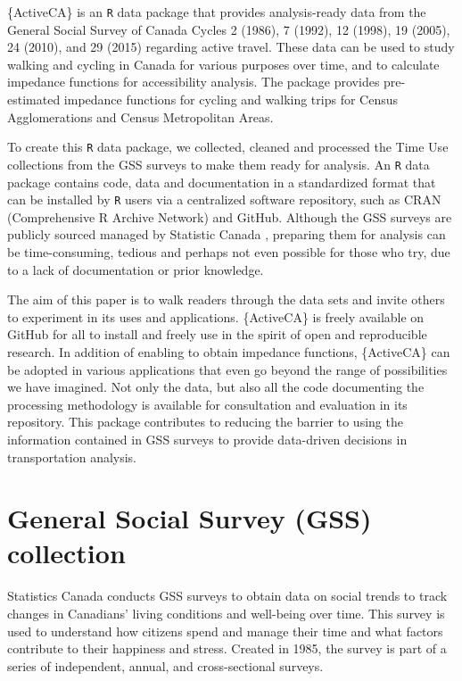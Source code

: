 \documentclass[Royal,times,sageh]{sagej}
\begin{document}
\{ActiveCA\} is an \texttt{R} data package that provides analysis-ready
data from the General Social Survey of Canada Cycles 2 (1986), 7 (1992),
12 (1998), 19 (2005), 24 (2010), and 29 (2015)
\citep{statisticscanada2024} regarding active travel. These data can be
used to study walking and cycling in Canada for various purposes over
time, and to calculate impedance functions for accessibility analysis.
The package provides pre-estimated impedance functions for cycling and
walking trips for Census Agglomerations and Census Metropolitan Areas.

To create this \texttt{R} data package, we collected, cleaned and
processed the Time Use collections from the GSS surveys to make them
ready for analysis. An \texttt{R} data package contains code, data and
documentation in a standardized format that can be installed by
\texttt{R} users via a centralized software repository, such as CRAN
(Comprehensive R Archive Network) and GitHub. Although the GSS surveys
are publicly sourced managed by Statistic Canada
\citep{statisticscanada2024}, preparing them for analysis can be
time-consuming, tedious and perhaps not even possible for those who try,
due to a lack of documentation or prior knowledge.

The aim of this paper is to walk readers through the data sets and
invite others to experiment in its uses and applications. \{ActiveCA\}
is freely available on GitHub for all to install and freely use in the
spirit of open and reproducible research. In addition of enabling to
obtain impedance functions, \{ActiveCA\} can be adopted in various
applications that even go beyond the range of possibilities we have
imagined. Not only the data, but also all the code documenting the
processing methodology is available for consultation and evaluation in
its repository. This package contributes to reducing the barrier to
using the information contained in GSS surveys to provide data-driven
decisions in transportation analysis.

\section{General Social Survey (GSS)
collection}\label{general-social-survey-gss-collection}

Statistics Canada \citeyearpar{statisticscanada2024} conducts GSS
surveys to obtain data on social trends to track changes in Canadians'
living conditions and well-being over time. This survey is used to
understand how citizens spend and manage their time and what factors
contribute to their happiness and stress. Created in 1985, the survey is
part of a series of independent, annual, and cross-sectional surveys.
\end{document}
